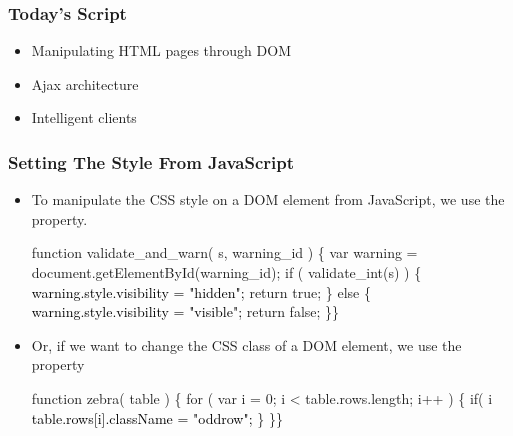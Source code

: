 \documentclass[svgnames]{beamer}
\subtitle{Introduction To Ajax}
\author{Ken Friis Larsen\\\scriptsize (Some slides prepared together
  with Henning Niss)}
\begin{document}
\begin{frame}
  \titlepage{}
\end{frame}


\begin{frame} 
\frametitle{Today's Script}
\begin{itemize}
\item Manipulating HTML pages through DOM
\item Ajax architecture
\item Intelligent clients
\end{itemize}
\end{frame}


\begin{frame}[fragile=singleslide] 
\frametitle{Setting The Style From JavaScript}

\begin{itemize}
\item To manipulate the CSS style on a DOM element from JavaScript, we
  use the  property.
\begin{semiverbatim}
\footnotesize\color{gray}function validate_and_warn( s, warning_id ) \{
  var warning = document.getElementById(warning_id);
  if ( validate_int(s) ) \{
    \textcolor{black}{warning.style.visibility = "hidden";}
    return true;
  \} else \{
    \textcolor{black}{warning.style.visibility = "visible";}
    return false;
  \}\}
\end{semiverbatim}

\item Or, if we want to change the CSS class of a DOM element, we use
  the  property
\begin{semiverbatim}
\footnotesize\color{gray}function zebra( table ) \{
  for ( var i = 0; i < table.rows.length; i++ ) \{
    if( i %
      \textcolor{black}{table.rows[i].className = "oddrow";}
    \}
  \}\}
\end{semiverbatim}
\end{itemize}
\end{frame}
\end{document}
